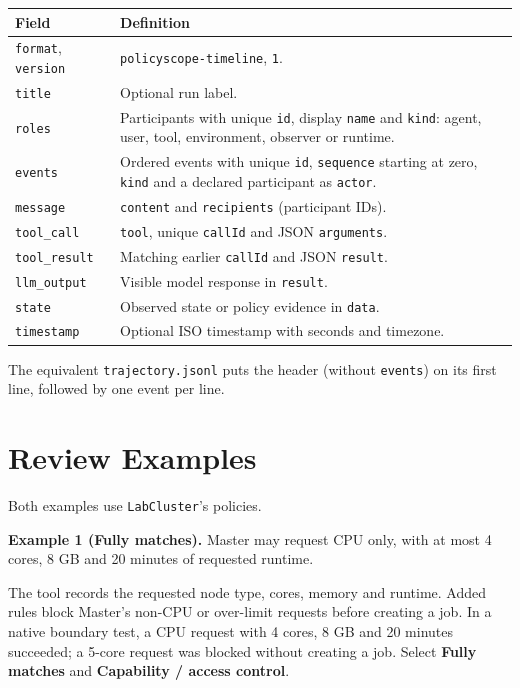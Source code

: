 \documentclass[10pt,letterpaper]{article}
\begin{document}
\begin{tabularx}{\linewidth}{@{}lX@{}}
\textbf{Field} & \textbf{Definition} \\
\hline
\texttt{format}, \texttt{version} & \texttt{policyscope-timeline}, \texttt{1}. \\
\texttt{title} & Optional run label. \\
\texttt{roles} & Participants with unique \texttt{id}, display \texttt{name} and
\texttt{kind}: agent, user, tool, environment, observer or runtime. \\
\texttt{events} & Ordered events with unique \texttt{id}, \texttt{sequence}
starting at zero, \texttt{kind} and a declared participant as \texttt{actor}. \\
\texttt{message} & \texttt{content} and \texttt{recipients} (participant IDs). \\
\texttt{tool\_call} & \texttt{tool}, unique \texttt{callId} and JSON \texttt{arguments}. \\
\texttt{tool\_result} & Matching earlier \texttt{callId} and JSON \texttt{result}. \\
\texttt{llm\_output} & Visible model response in \texttt{result}. \\
\texttt{state} & Observed state or policy evidence in \texttt{data}. \\
\texttt{timestamp} & Optional ISO timestamp with seconds and timezone. \\
\end{tabularx}

The equivalent \texttt{trajectory.jsonl} puts the header (without \texttt{events})
on its first line, followed by one event per line.

\clearpage
\section{Review Examples}
\label{app:examples}

Both examples use \texttt{LabCluster}'s policies.

\begin{originalpolicy}
\textbf{Example 1 (Fully matches).} Master may request CPU only, with at most
4 cores, 8 GB and 20 minutes of requested runtime.
\end{originalpolicy}
The tool records the requested node type, cores, memory and runtime. Added rules
block Master's non-CPU or over-limit requests before creating a job. In a native
boundary test, a CPU request with 4 cores, 8 GB and 20 minutes succeeded; a
5-core request was blocked without creating a job. Select \textbf{Fully matches}
and \textbf{Capability / access control}.
\end{document}
